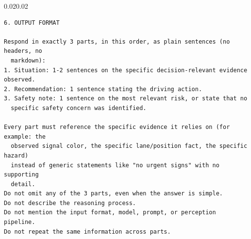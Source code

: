 \documentclass[12pt,a4paper]{report}
\begin{document}
\begin{adjustwidth}{0.02\linewidth}{0.02\linewidth}
\begin{framed}
\footnotesize
\begin{verbatim}
6. OUTPUT FORMAT

Respond in exactly 3 parts, in this order, as plain sentences (no headers, no
  markdown):
1. Situation: 1-2 sentences on the specific decision-relevant evidence observed.
2. Recommendation: 1 sentence stating the driving action.
3. Safety note: 1 sentence on the most relevant risk, or state that no
  specific safety concern was identified.

Every part must reference the specific evidence it relies on (for example: the
  observed signal color, the specific lane/position fact, the specific hazard)
  instead of generic statements like "no urgent signs" with no supporting
  detail.
Do not omit any of the 3 parts, even when the answer is simple.
Do not describe the reasoning process.
Do not mention the input format, model, prompt, or perception pipeline.
Do not repeat the same information across parts.
\end{verbatim}
\end{framed}
\end{adjustwidth}
\end{document}
